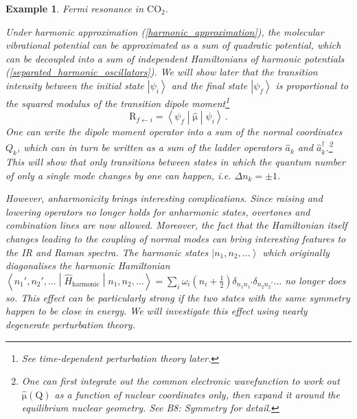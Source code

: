 \documentclass{article}
\theoremstyle{plain}\theoremheaderfont{\normalfont\itshape}\theorembodyfont{\rmfamily}\theoremseparator{.}\newtheorem*{rem}{Remark}\newtheorem*{ex}{Example}\newtheorem*{proof}{Proof}\newtheorem*{altp}{Alternative proof}
\theoremstyle{plain}\theoremheaderfont{\normalfont\bfseries}\theorembodyfont{\rmfamily}\theoremseparator{.}\newtheorem{thm}{Theorem}[section]\newtheorem{lem}[thm]{Lemma}\newtheorem{prop}[thm]{Proposition}\newtheorem*{cor}{Corollary}\newtheorem{defn}[thm]{Definition}\newtheorem{clm}[thm]{Claim}\newtheorem{clminproof}{Claim}
\theoremstyle{break}\theoremheaderfont{\normalfont\itshape}\theorembodyfont{\rmfamily}\theoremseparator{.\medskip}\newtheorem*{proofskip}{Proof}\newtheorem*{exs}{Examples}\newtheorem*{rems}{Remarks}
\theoremstyle{break}\theoremheaderfont{\normalfont\bfseries}\theorembodyfont{\rmfamily}\theoremseparator{.\medskip}\newtheorem{lemskip}[thm]{Lemma}\newtheorem{defnskip}[thm]{Definition}\newtheorem{propskip}[thm]{Proposition}\newtheorem{thmskip}[thm]{Theorem}
\numberwithin{equation}{section}
\newcommand{\ket}[1]{\left| #1 \right\rangle}
\newcommand{\mel}[3]{\left\langle #1 \middle| #2 \middle| #3 \right\rangle}
\newcommand{\vb}[1]{\bm{\mathrm{#1}}}
\begin{document}
    \begin{ex}
        \textit{Fermi resonance in \(\mathrm{CO_2}\).}

        Under harmonic approximation (\ref{harmonic_approximation}), the molecular vibrational potential can be approximated as a sum of quadratic potential, which can be decoupled into a sum of independent Hamiltonians of harmonic potentials (\ref{separated_harmonic_oscillators}). We will show later that the transition intensity between the initial state \(\ket{\psi_i}\) and the final state \(\ket{\psi_f}\) is proportional to the squared modulus of the transition dipole moment\footnote{See time-dependent perturbation theory later.}
        \begin{equation}
            \vb{R}_{f\leftarrow i}=\mel{\psi_f}{\hat{\vb{\mu}}}{\psi_i}\,.
        \end{equation}
        One can write the dipole moment operator into a sum of the normal coordinates \(Q_k\), which can in turn be written as a sum of the ladder operators \(\hat{a}_k\) and \(\hat{a}_k^\dagger\).\footnote{One can first integrate out the common electronic wavefunction to work out \(\hat{\vb{\mu}}(\vb{Q})\) as a function of nuclear coordinates only, then expand it around the equilibrium nuclear geometry. See \textit{B8: Symmetry} for detail.} This will show that only transitions between states in which the quantum number of only a single mode changes by one can happen, i.e. \(\Delta n_k = \pm 1\).

        However, anharmonicity brings interesting complications. Since raising and lowering operators no longer holds for anharmonic states, overtones and combination lines are now allowed. Moreover, the fact that the Hamiltonian itself changes leading to the coupling of normal modes can bring interesting features to the IR and Raman spectra. The harmonic states \(\ket{n_1,n_2,\dots}\) which originally diagonalises the harmonic Hamiltonian \(\mel{n_1',n_2',\dots}{\hat{H}_{\text{harmonic}}}{n_1,n_2,\dots}=\sum_i\omega_i(n_i+\frac{1}{2})\delta_{n_1n_1'}\delta_{n_2n_2'}\dots\) no longer does so. This effect can be particularly strong if the two states with the same symmetry happen to be close in energy. We will investigate this effect using nearly degenerate perturbation theory.


\end{ex}
\end{document}
